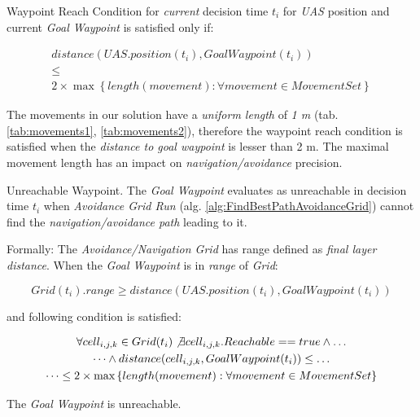 \begin{definition}{Waypoint Reach Condition}\label{def:waypointReachCondition} for \emph{current} decision time $t_i$ for \emph{UAS} position and current \emph{Goal Waypoint} is satisfied only if:

\begin{multline}\label{eq:waypointReachCondition}
    distance(UAS.position(t_i),GoalWaypoint(t_i)) \\\le \\2 \times \max \left\{length(movement):\forall movement\in MovementSet\right\}
\end{multline}

    \begin{note}
        The movements in our solution have a \emph{uniform length} of \emph{1 m} (tab. \ref{tab:movements1}, \ref{tab:movements2}), therefore the waypoint reach condition is satisfied when the \emph{distance to goal waypoint} is lesser than 2 m. The maximal movement length has an impact on \emph{navigation/avoidance} precision.
    \end{note}
\end{definition}

\begin{definition}{Unreachable Waypoint}\label{def:unreachable Waypoint}. The \emph{Goal Waypoint} evaluates as unreachable in decision time $t_i$ when \emph{Avoidance Grid Run} (alg. \ref{alg:FindBestPathAvoidanceGrid}) cannot find the \emph{navigation/avoidance path} leading to it.

\noindent Formally: The \emph{Avoidance/Navigation Grid} has range defined as \emph{final layer distance}. When the \emph{Goal Waypoint} is in  \emph{range} of \emph{Grid}:

\begin{equation}
    Grid(t_i).range \ge distance(UAS.position(t_i),GoalWaypoint(t_i))
\end{equation}

\noindent and following condition is satisfied:

\begin{multline}\label{eq:unreachableWaypoint}
    \forall cell_{i,j,k}\in Grid(t_i) \not\exists cell_{i,j,k}. Reachable == true \wedge\dots  \\\dots\wedge distance(cell_{i,j,k}, Goal Waypoint(t_i)) \le\dots \\ \dots\le 2 \times \max \left\{length(movement):\forall movement\in MovementSet\right\}
\end{multline}

\noindent The \emph{Goal Waypoint} is unreachable.

\end{definition}

